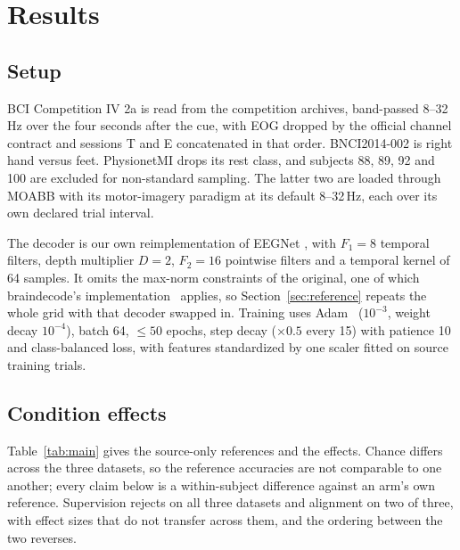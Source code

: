 \section{Results}
\label{sec:results}

\subsection{Setup}
BCI Competition IV 2a \cite{tangermann2012bcicompiv} is read from the competition archives, band-passed 8--32\,Hz over the four seconds after the cue, with EOG dropped by the official channel contract and sessions T and E concatenated in that order. BNCI2014-002 \cite{steyrl2016bnci} is right hand versus feet. PhysionetMI \cite{schalk2004bci2000,goldberger2000physionet} drops its rest class, and subjects 88, 89, 92 and 100 are excluded for non-standard sampling. The latter two are loaded through MOABB \cite{jayaram2018moabb} with its motor-imagery paradigm at its default 8--32\,Hz, each over its own declared trial interval.

The decoder is our own reimplementation of EEGNet \cite{lawhern2018eegnet}, with $F_1=8$ temporal filters, depth multiplier $D=2$, $F_2=16$ pointwise filters and a temporal kernel of 64 samples. It omits the max-norm constraints of the original, one of which braindecode's implementation~\cite{schirrmeister2017deep} applies, so Section~\ref{sec:reference} repeats the whole grid with that decoder swapped in. Training uses Adam~\cite{kingma2015adam} ($10^{-3}$, weight decay $10^{-4}$), batch 64, $\leq50$ epochs, step decay ($\times0.5$ every 15) with patience 10 and class-balanced loss, with features standardized by one scaler fitted on source training trials.

\subsection{Condition effects}
Table~\ref{tab:main} gives the source-only references and the effects. Chance differs across the three datasets, so the reference accuracies are not comparable to one another; every claim below is a within-subject difference against an arm's own reference. Supervision rejects on all three datasets and alignment on two of three, with effect sizes that do not transfer across them, and the ordering between the two reverses.



